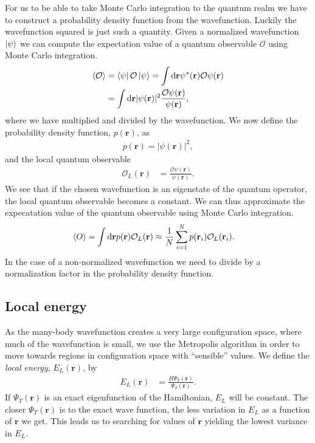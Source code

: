 \documentclass[
    a4paper, aps, twocolumn, floatfix, superscriptaddress,
    nofootinbib]{revtex4-1}
\newcommand{\vf}{\mathbf}
\newcommand{\1}{\mathds{1}}
\begin{document}
        For us to be able to take Monte Carlo integration to the quantum realm
        we have to construct a probability density function from the
        wavefunction. Luckily the wavefunction squared is just such a quantity.
        Given a normalized wavefunction $\ket{\psi}$ we can compute the
        expectation value of a quantum observable $\mathcal{O}$ using Monte
        Carlo integration.
        \begin{align}
            \expval{\mathcal{O}}
            &= \bra{\psi}\mathcal{O}\ket{\psi}
            =
            \int\dd\vf{r}
            \psi^{*}(\vf{r})\mathcal{O}\psi(\vf{r})
            \\
            &=
            \int\dd\vf{r}
            |\psi(\vf{r})|^2
            \frac{\mathcal{O}\psi(\vf{r})}{\psi(\vf{r})},
        \end{align}
        where we have multiplied and divided by the wavefunction. We now define
        the probability density function, $p(\vf{r})$, as
        \begin{align}
            p(\vf{r}) = |\psi(\vf{r})|^2,
        \end{align}
        and the local quantum observable
        \begin{align}
            \mathcal{O}_L(\vf{r})
            &= \frac{\mathcal{O}\psi(\vf{r})}{\psi(\vf{r})}.
        \end{align}
        We see that if the chosen wavefunction is an eigenstate of the quantum
        operator, the local quantum observable becomes a constant.  We can thus
        approximate the expecatation value of the quantum observable using Monte
        Carlo integration.
        \begin{align}
            \expval{O}
            &=
            \int\dd\vf{r}
            p(\vf{r})
            \mathcal{O}_L(\vf{r})
            \approx
            \frac{1}{N}\sum_{i = 1}^N
            p(\vf{r}_i)\mathcal{O}_L(\vf{r}_i).
        \end{align}
        In the case of a non-normalized wavefunction we need to divide by a
        normalization factor in the probability density function.


    \subsection{Local energy}
        As the many-body wavefunction creates a very large configuration space,
        where much of the wavefunction is small, we use the Metropolis algorithm
        in order to move towards regions in configuration space with
        ``sensible'' values. We define the \emph{local energy}, $E_L(\vf{r})$,
        by
        \begin{align}
            E_L(\vf{r})
            &= \frac{H\Psi_T(\vf{r})}{\Psi_T(\vf{r})}.
        \end{align}
        If $\Psi_T(\vf{r})$ is an exact eigenfunction of the Hamiltonian, $E_L$
        will be constant. The closer $\Psi_T(\vf{r})$ is to the exact wave
        function, the less variation in $E_L$ as a function of $\vf{r}$ we get.
        This leads us to searching for values of $\vf{r}$ yielding the lowest
        variance in $E_L$.
\end{document}
